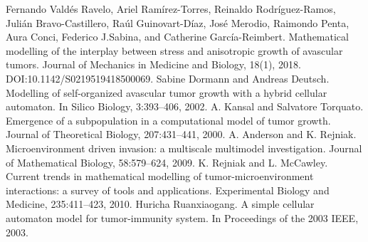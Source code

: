 \begin{thebibliography}{99}
\vskip 0.2cm
Fernando Vald\'es Ravelo, Ariel Ram\'irez-Torres, Reinaldo Rodr\'iguez-Ramos, Juli\'an Bravo-Castillero, Ra\'ul Guinovart-D\'iaz, Jos\'e Merodio, Raimondo Penta, Aura Conci, Federico J.Sabina, and Catherine Garc\'ia-Reimbert. Mathematical modelling of the interplay between stress and anisotropic growth of avascular tumors. Journal of Mechanics in Medicine and Biology, 18(1), 2018. DOI:10.1142/S0219519418500069.
\vskip 0.2cm
Sabine Dormann and Andreas Deutsch. Modelling of self-organized avascular tumor growth with a hybrid cellular automaton. In Silico Biology, 3:393–406, 2002.
\vskip 0.2cm
A. Kansal and Salvatore Torquato. Emergence of a subpopulation in a computational model of tumor growth. Journal of Theoretical Biology, 207:431–441, 2000.
\vskip 0.2cm
A. Anderson and K. Rejniak. Microenvironment driven invasion: a multiscale multimodel investigation. Journal of Mathematical Biology, 58:579–624, 2009.
\vskip 0.2cm
K. Rejniak and L. McCawley. Current trends in mathematical modelling of tumor-microenvironment interactions: a survey of tools and applications. Experimental Biology and Medicine, 235:411–423, 2010.
\vskip 0.2cm
Huricha Ruanxiaogang. A simple cellular automaton model for tumor-immunity system. In Proceedings of the 2003 IEEE, 2003.
    





\end{thebibliography}

